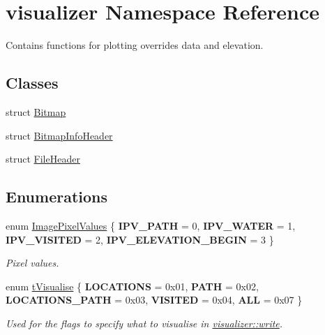 \hypertarget{namespacevisualizer}{}\section{visualizer Namespace Reference}
\label{namespacevisualizer}


Contains functions for plotting overrides data and elevation.  


\subsection*{Classes}
\begin{DoxyCompactItemize}
\item 
struct \mbox{\hyperlink{structvisualizer_1_1_bitmap}{Bitmap}}
\item 
struct \mbox{\hyperlink{structvisualizer_1_1_bitmap_info_header}{Bitmap\+Info\+Header}}
\item 
struct \mbox{\hyperlink{structvisualizer_1_1_file_header}{File\+Header}}
\end{DoxyCompactItemize}
\subsection*{Enumerations}
\begin{DoxyCompactItemize}
\item 
\mbox{\label{namespacevisualizer_af36cea222d0362709a55b17474afcc8a}} 
enum \mbox{\hyperlink{namespacevisualizer_af36cea222d0362709a55b17474afcc8a}{Image\+Pixel\+Values}} \{ {\bfseries I\+P\+V\+\_\+\+P\+A\+TH} = 0, 
{\bfseries I\+P\+V\+\_\+\+W\+A\+T\+ER} = 1, 
{\bfseries I\+P\+V\+\_\+\+V\+I\+S\+I\+T\+ED} = 2, 
{\bfseries I\+P\+V\+\_\+\+E\+L\+E\+V\+A\+T\+I\+O\+N\+\_\+\+B\+E\+G\+IN} = 3
 \}
\begin{DoxyCompactList}\small\item\em Pixel values. \end{DoxyCompactList}\item 
\mbox{\label{namespacevisualizer_ad08cef44b6dbff468f08c62effe9cb8f}} 
enum \mbox{\hyperlink{namespacevisualizer_ad08cef44b6dbff468f08c62effe9cb8f}{t\+Visualise}} \{ \newline
{\bfseries L\+O\+C\+A\+T\+I\+O\+NS} = 0x01, 
{\bfseries P\+A\+TH} = 0x02, 
{\bfseries L\+O\+C\+A\+T\+I\+O\+N\+S\+\_\+\+P\+A\+TH} = 0x03, 
{\bfseries V\+I\+S\+I\+T\+ED} = 0x04, 
\newline
{\bfseries A\+LL} = 0x07
 \}
\begin{DoxyCompactList}\small\item\em Used for the flags to specify what to visualise in \mbox{\hyperlink{namespacevisualizer_a2f66e38c689ff3c3731faa95739bbf25}{visualizer\+::write}}. \end{DoxyCompactList}\end{DoxyCompactItemize}
